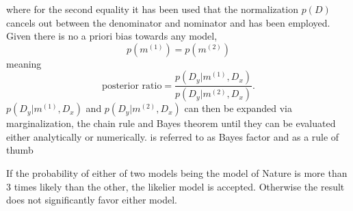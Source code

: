 where for the second equality it has been used that the normalization $p(D)$ cancels out between the denominator and nominator and  has been employed. Given there is no a priori bias towards any model, 
\begin{equation} 
	p(m^{(1)}) = p(m^{(2)}) 
\end{equation} 
meaning 
\begin{equation} 
	\text{posterior ratio} = \frac{p(D_y|m^{(1)},D_x)}{p(D_y|m^{(2)},D_x)}. 
	\label{eq:bayes_factor} 
\end{equation} 
$p(D_y|m^{(1)},D_x)$ and $p(D_y|m^{(2)},D_x)$ can then be expanded via marginalization, the chain rule and Bayes theorem until they can be evaluated either analytically or numerically.  is referred to as Bayes factor and as a rule of thumb 

\begin{definition} 
	If the probability of either of two models being the model of Nature is more than 3 times likely than the other, the likelier model is accepted. Otherwise the result does not significantly favor either model. 
\end{definition}
